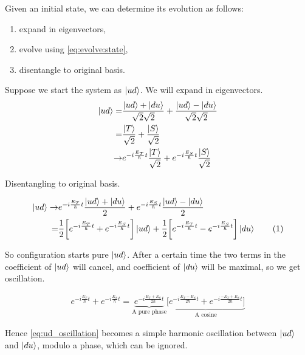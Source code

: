 \documentclass[]{article}
\newcommand\numberthis{\addtocounter{equation}{1}\tag{\theequation}}
\begin{document}
Given an initial state, we can determine its evolution as follows:
\begin{enumerate}
	\item expand in eigenvectors,
	\item evolve using \eqref{eq:evolve:state},
	\item disentangle to original basis.
\end{enumerate} 

Suppose we start the system as $\ket{ud}$. We will expand in eigenvectors.
\begin{align*}
	\ket{ud} =& \frac{\ket{ud}+\ket{du}}{\sqrt{2} \sqrt{2}} + \frac{\ket{ud}-\ket{du}}{\sqrt{2} \sqrt{2}}\\
	=& \frac{\ket{T}}{\sqrt{2}} + \frac{\ket{S}}{\sqrt{2}}\\
	\rightarrow&e^{-i \frac{E_T}{\hbar}t} \frac{\ket{T}}{\sqrt{2}} + e^{-i \frac{E_S}{\hbar}t} \frac{\ket{S}}{\sqrt{2}}
\end{align*}

Disentangling to original basis.

\begin{align*}
	\ket{ud} \rightarrow& e^{-i \frac{E_T}{\hbar}t} \frac{\ket{ud}+\ket{du}}{2} +  e^{-i \frac{E_S}{\hbar}t} \frac{\ket{ud}-\ket{du}}{2}\\
	=& \frac{1}{2}\bigg[ e^{-i \frac{E_T}{\hbar}t} + e^{-i \frac{E_S}{\hbar}t} \bigg]\ket{ud} + \frac{1}{2}\bigg[ e^{-i \frac{E_T}{\hbar}t} - e^{-i \frac{E_S}{\hbar}t}\bigg]\ket{du} \numberthis \label{eq:ud_oscillation}
\end{align*}

So configuration starts pure $\ket{ud}$. After a certain time the two terms in the coefficient of $\ket{ud}$ will cancel, and coefficient of $\ket{du}$ will be maximal, so we get oscillation.

\begin{align*}
	 e^{-i \frac{E_T}{\hbar}t} + e^{-i \frac{E_S}{\hbar}t} = \underbrace{e^{-i \frac{E_T+E_S}{2\hbar}t}}_\text{A pure phase}\underbrace{\bigg[e^{-i \frac{E_T-E_S}{2\hbar}t}+e^{-i \frac{-E_T+E_S}{2\hbar}t}\bigg]}_\text{A cosine}
\end{align*}

Hence \eqref{eq:ud_oscillation} becomes a simple harmonic oscillation between $\ket{ud}$ and $\ket{du}$, modulo a phase, which can be ignored.


\raggedright

\end{document}
